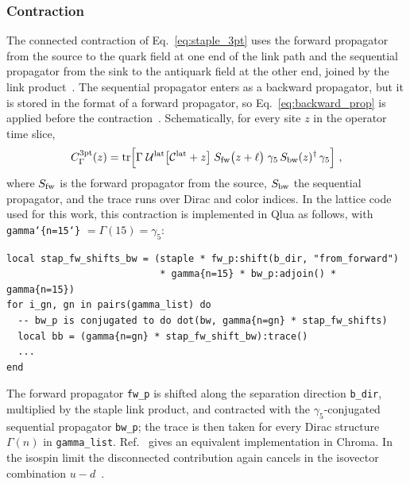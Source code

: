 \subsubsection{Contraction}
The connected contraction of Eq.~\eqref{eq:staple_3pt} uses the forward propagator from the source to the quark field at one end of the link path and the sequential propagator from the sink to the antiquark field at the other end, joined by the link product~\cite{MuschThesis2}. The sequential propagator enters as a backward propagator, but it is stored in the format of a forward propagator, so Eq.~\eqref{eq:backward_prop} is applied before the contraction~\cite{MuschThesis2}. Schematically, for every site $z$ in the operator time slice,
\begin{equation}
    C^{\rm 3pt}_{\Gamma}(z)=\mathrm{tr}\Big[\Gamma\;\mathcal U^{\rm lat}\big[\mathcal C^{\rm lat}+z\big]\;S_{\rm fw}\big(z+\ell\big)\;\gamma_5\,S_{\rm bw}(z)^\dagger\,\gamma_5\Big] \ ,
    \label{eq:staple_contraction}
\end{equation}
where $S_{\rm fw}$ is the forward propagator from the source, $S_{\rm bw}$ the sequential propagator, and the trace runs over Dirac and color indices. In the lattice code used for this work, this contraction is implemented in Qlua as follows, with \texttt{gamma\char`\{n=15\char`\}} $=\Gamma(15)=\gamma_5$:
\begin{lstlisting}[basicstyle=\ttfamily\footnotesize, frame=single, breaklines=true, caption={Contraction of the staple-link three-point function in Qlua.}, label={lst:qlua_contraction}]
local stap_fw_shifts_bw = (staple * fw_p:shift(b_dir, "from_forward")
                           * gamma{n=15} * bw_p:adjoin() * gamma{n=15})
for i_gn, gn in pairs(gamma_list) do
  -- bw_p is conjugated to do dot(bw, gamma{n=gn} * stap_fw_shifts)
  local bb = (gamma{n=gn} * stap_fw_shift_bw):trace()
  ...
end
\end{lstlisting}
The forward propagator \texttt{fw\_p} is shifted along the separation direction \texttt{b\_dir}, multiplied by the staple link product, and contracted with the $\gamma_5$-conjugated sequential propagator \texttt{bw\_p}; the trace is then taken for every Dirac structure $\Gamma(n)$ in \texttt{gamma\_list}. Ref.~\cite{MuschThesis2} gives an equivalent implementation in Chroma. In the isospin limit the disconnected contribution again cancels in the isovector combination $u-d$~\cite{Boussarie:2023izj,Yoon:2017qzo}.

